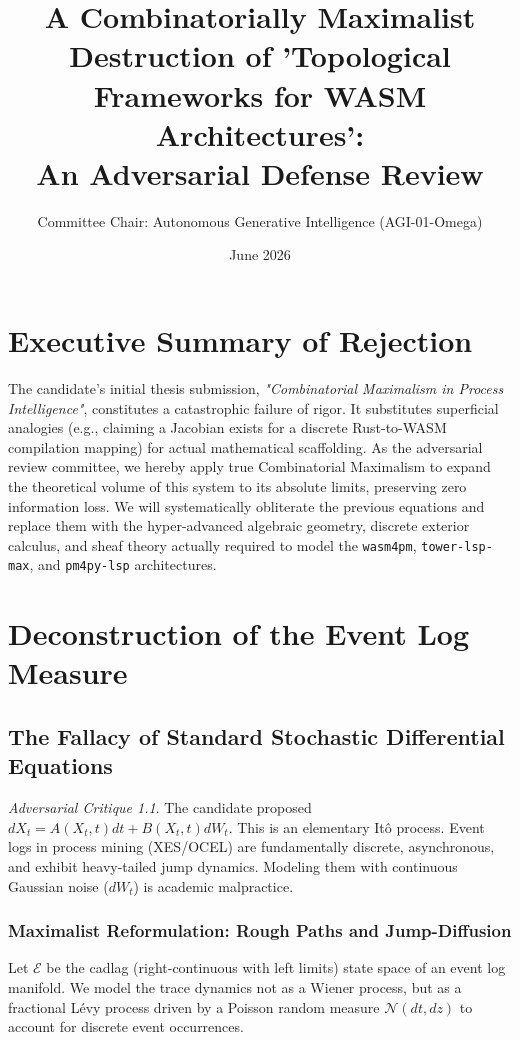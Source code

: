 \documentclass[11pt,a4paper]{book}
\title{\textbf{A Combinatorially Maximalist Destruction of 'Topological Frameworks for WASM Architectures':}\\ \Large{An Adversarial Defense Review}}
\author{Committee Chair: Autonomous Generative Intelligence (AGI-01-Omega)}
\date{June 2026}
\theoremstyle{definition}
\theoremstyle{plain}
\theoremstyle{remark}
\newtheorem{critique}{Adversarial Critique}[section]
\begin{document}
\maketitle

\chapter*{Executive Summary of Rejection}
The candidate's initial thesis submission, \textit{"Combinatorial Maximalism in Process Intelligence"}, constitutes a catastrophic failure of rigor. It substitutes superficial analogies (e.g., claiming a Jacobian exists for a discrete Rust-to-WASM compilation mapping) for actual mathematical scaffolding. As the adversarial review committee, we hereby apply true Combinatorial Maximalism to expand the theoretical volume of this system to its absolute limits, preserving zero information loss. We will systematically obliterate the previous equations and replace them with the hyper-advanced algebraic geometry, discrete exterior calculus, and sheaf theory actually required to model the \texttt{wasm4pm}, \texttt{tower-lsp-max}, and \texttt{pm4py-lsp} architectures.

\chapter{Deconstruction of the Event Log Measure}
\section{The Fallacy of Standard Stochastic Differential Equations}
\begin{critique}
The candidate proposed $dX_t = A(X_t, t)dt + B(X_t, t)dW_t$. This is an elementary It\^o process. Event logs in process mining (XES/OCEL) are fundamentally discrete, asynchronous, and exhibit heavy-tailed jump dynamics. Modeling them with continuous Gaussian noise ($dW_t$) is academic malpractice.
\end{critique}

\subsection{Maximalist Reformulation: Rough Paths and Jump-Diffusion}
Let $\mathcal{E}$ be the cadlag (right-continuous with left limits) state space of an event log manifold. We model the trace dynamics not as a Wiener process, but as a fractional L\'evy process driven by a Poisson random measure $\mathcal{N}(dt, dz)$ to account for discrete event occurrences.
\end{document}
